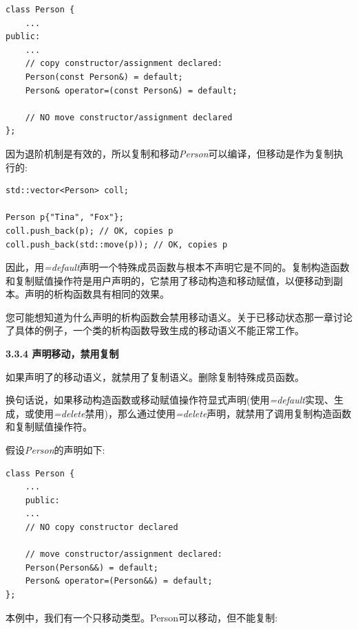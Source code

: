 \begin{lstlisting}[caption={}]
class Person {
	...
public:
	...
	// copy constructor/assignment declared:
	Person(const Person&) = default;
	Person& operator=(const Person&) = default;
	
	// NO move constructor/assignment declared
};
\end{lstlisting}

因为退阶机制是有效的，所以复制和移动\textit{Person}可以编译，但移动是作为复制执行的:\par

\begin{lstlisting}[caption={}]
std::vector<Person> coll;

Person p{"Tina", "Fox"};
coll.push_back(p); // OK, copies p
coll.push_back(std::move(p)); // OK, copies p
\end{lstlisting}

因此，用\textit{=default}声明一个特殊成员函数与根本不声明它是不同的。复制构造函数和复制赋值操作符是用户声明的，它禁用了移动构造和移动赋值，以便移动到副本。声明的析构函数具有相同的效果。\par

您可能想知道为什么声明的析构函数会禁用移动语义。关于已移动状态那一章讨论了具体的例子，一个类的析构函数导致生成的移动语义不能正常工作。\par

\hspace*{\fill} \par %
\textbf{3.3.4 声明移动，禁用复制}

如果声明了的移动语义，就禁用了复制语义。删除复制特殊成员函数。\par

换句话说，如果移动构造函数或移动赋值操作符显式声明(使用\textit{=default}实现、生成，或使用\textit{=delete}禁用)，那么通过使用\textit{=delete}声明，就禁用了调用复制构造函数和复制赋值操作符。\par

假设\textit{Person}的声明如下:\par

\begin{lstlisting}[caption={}]
class Person {
	...
	public:
	...
	// NO copy constructor declared
	
	// move constructor/assignment declared:
	Person(Person&&) = default;
	Person& operator=(Person&&) = default;
};
\end{lstlisting}

本例中，我们有一个只移动类型。Person可以移动，但不能复制:\par

